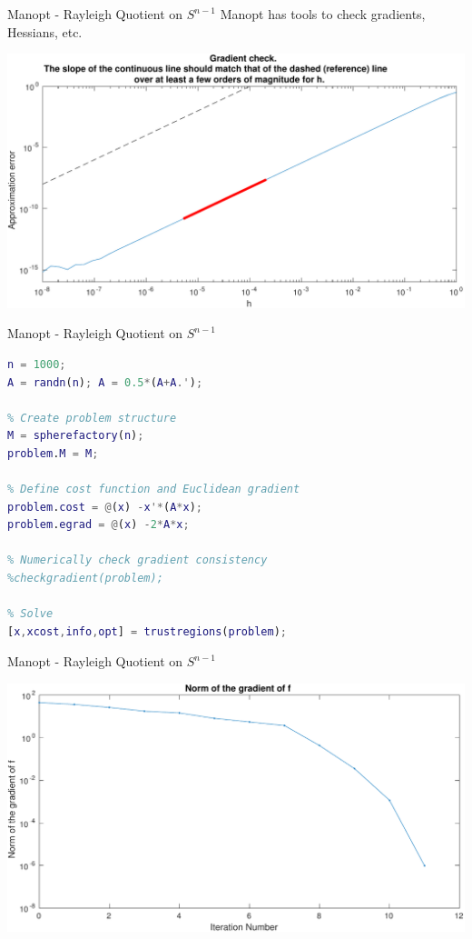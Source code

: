 \documentclass[xcolor=dvipsnames,t]{beamer} %
\begin{document}
\begin{frame}[fragile]{Manopt - Rayleigh Quotient on $S^{n-1}$}
   Manopt has tools to check gradients, Hessians, etc.
   \begin{center}
      \includegraphics[width=\textwidth]{figures/rayleigh_sphere_gradcheck.pdf}
   \end{center}
\end{frame}

\begin{frame}[fragile]{Manopt - Rayleigh Quotient on $S^{n-1}$}

{
\begin{lstlisting}[language=Matlab,escapechar=!]
% Generate symmetric matrix
n = 1000;
A = randn(n); A = 0.5*(A+A.');

% Create problem structure
M = spherefactory(n);
problem.M = M;

% Define cost function and Euclidean gradient
problem.cost = @(x) -x'*(A*x);
problem.egrad = @(x) -2*A*x;

% Numerically check gradient consistency
%checkgradient(problem);

% Solve
[x,xcost,info,opt] = trustregions(problem);
\end{lstlisting}
}

\end{frame}

\begin{frame}[fragile]{Manopt - Rayleigh Quotient on $S^{n-1}$}
   \begin{center}
      \includegraphics[width=\textwidth]{figures/rayleigh_sphere_gradnorm.pdf}
   \end{center}
\end{frame}
\end{document}
